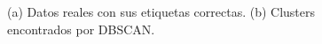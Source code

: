 \begin{figure}[ht]
\begin{subfigure}[t]{0.5\linewidth}
        \caption{}
    \end{subfigure}
    \caption{(a) Datos reales con sus etiquetas correctas. (b) Clusters encontrados por DBSCAN.}
    \label{fig:dbscan}
\end{figure}